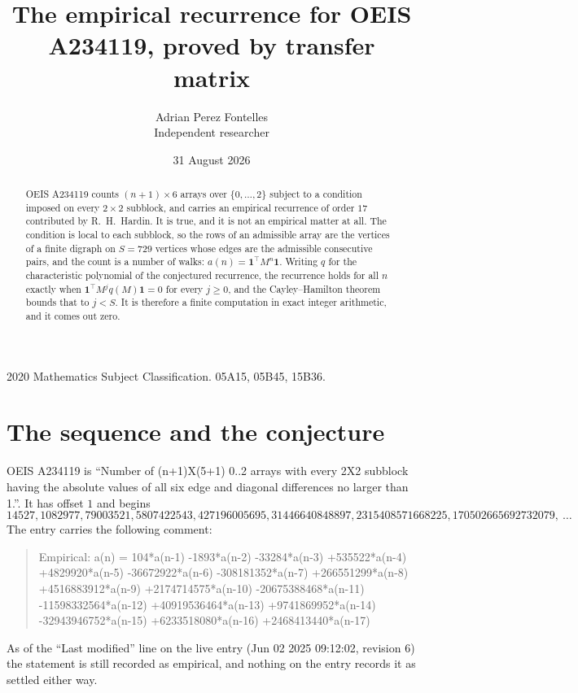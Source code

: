 \documentclass[11pt,a4paper]{article}
\title{The empirical recurrence for OEIS A234119, proved by transfer matrix}
\author{Adrian Perez Fontelles\\ \small Independent researcher}
\date{31 August 2026}
\theoremstyle{plain}
\theoremstyle{definition}
\begin{document}
\maketitle

\begin{abstract}
OEIS A234119 counts $(n+1)\times6$ arrays over $\{0,\dots,2\}$ subject to a condition imposed on
every $2\times2$ subblock, and carries an empirical recurrence of order $17$ contributed
by R.~H.~Hardin. It is true, and it is not an empirical matter at all. The condition is local
to each subblock, so the rows of an admissible array are the vertices of a finite digraph
on $S=729$ vertices whose edges are the admissible consecutive pairs, and the count is a
number of walks: $a(n)=\mathbf{1}^{\!\top}M^{n}\mathbf{1}$. Writing $q$
for the characteristic polynomial of the conjectured recurrence, the recurrence holds for all
$n$ exactly when $\mathbf{1}^{\!\top}M^{j}q(M)\mathbf{1}=0$ for every $j\ge0$, and the
Cayley--Hamilton theorem bounds that to $j<S$. It is therefore a finite computation in exact
integer arithmetic, and it comes out zero.
\end{abstract}

\noindent\small 2020 Mathematics Subject Classification. 05A15, 05B45, 15B36.\normalsize

\section{The sequence and the conjecture}

OEIS A234119 is ``Number of (n+1)X(5+1) 0..2 arrays with every 2X2 subblock having the absolute values of all six edge and diagonal differences no larger than 1.''. It has offset $1$ and begins
\[
14527, 1082977, 79003521, 5807422543, 427196005695, 31446640848897, 2315408571668225, 170502665692732079,\ \dots
\]
The entry carries the following comment:
\begin{quote}\small
Empirical: a(n) = 104*a(n-1) -1893*a(n-2) -33284*a(n-3) +535522*a(n-4) +4829920*a(n-5) -36672922*a(n-6) -308181352*a(n-7) +266551299*a(n-8) +4516883912*a(n-9) +2174714575*a(n-10) -20675388468*a(n-11) -11598332564*a(n-12) +40919536464*a(n-13) +9741869952*a(n-14) -32943946752*a(n-15) +6233518080*a(n-16) +2468413440*a(n-17)
\end{quote}
As of the ``Last modified'' line on the live entry (Jun 02 2025 09:12:02, revision 6) the statement is
still recorded as empirical, and nothing on the entry records it as settled either way.
\end{document}
